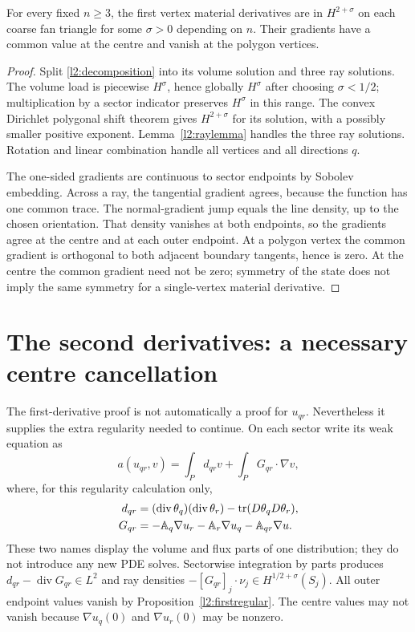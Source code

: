 \begin{proposition}
\label{l2:firstregular}
For every fixed $n\geq3$, the first vertex material derivatives are in
$H^{2+\sigma}$ on each coarse fan triangle for some $\sigma>0$ depending
on $n$. Their gradients have a common value at the centre and vanish at
the polygon vertices.
\end{proposition}
\begin{proof}
Split \eqref{l2:decomposition} into its volume solution and three ray
solutions. The volume load is piecewise $H^\sigma$, hence globally
$H^\sigma$ after choosing $\sigma<1/2$; multiplication by a sector
indicator preserves $H^\sigma$ in this range. The convex Dirichlet
polygonal shift theorem gives $H^{2+\sigma}$ for its solution, with a
possibly smaller positive exponent. Lemma~\ref{l2:raylemma} handles the
three ray solutions. Rotation and linear combination handle all vertices
and all directions $q$.

The one-sided gradients are continuous to sector endpoints by Sobolev
embedding. Across a ray, the tangential gradient agrees, because the
function has one common trace. The normal-gradient jump equals the line
density, up to the chosen orientation. That density vanishes at both
endpoints, so the gradients agree at the centre and at each outer endpoint.
At a polygon vertex the common gradient is orthogonal to both adjacent
boundary tangents, hence is zero. At the centre the common gradient need
not be zero; symmetry of the state does not imply the same symmetry for
a single-vertex material derivative.
\end{proof}

\section{The second derivatives: a necessary centre cancellation}
\label{l2:secondregular}
The first-derivative proof is not automatically a proof for $u_{qr}$.
Nevertheless it supplies the extra regularity needed to continue. On each
sector write its weak equation as
\[
 a(u_{qr},v)=\int_P d_{qr}v+\int_P G_{qr}\cdot\nabla v,
\]
where, for this regularity calculation only,
\begin{align*}
 d_{qr}&=(\operatorname{div}\theta_q)(\operatorname{div}\theta_r)
                               -\operatorname{tr}(D\theta_qD\theta_r),\\
 G_{qr}&=-\mathbb A_q\nabla u_r-\mathbb A_r\nabla u_q
                                  -\mathbb A_{qr}\nabla u.
\end{align*}
These two names display the volume and flux parts of one distribution;
they do not introduce any new PDE solves. Sectorwise integration by parts
produces $d_{qr}-\operatorname{div}G_{qr}\in L^2$ and ray densities
$-[G_{qr}]_j\cdot\nu_j\in H^{1/2+\sigma}(S_j)$.
All outer endpoint values vanish by Proposition~\ref{l2:firstregular}.
The centre values may not vanish because $\nabla u_q(0)$ and
$\nabla u_r(0)$ may be nonzero.

